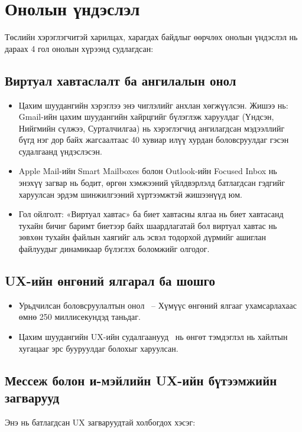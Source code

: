 \section{Онолын үндэслэл}

Төслийн хэрэглэгчитэй харилцах, харагдах байдлыг өөрчлөх онолын үндэслэл нь дараах 4 гол онолын хүрээнд судлагдсан:
\subsection{Виртуал хавтаслалт ба ангилалын онол}
\begin{itemize}
    \item Цахим шуудангийн хэрэглээ энэ чиглэлийг анхлан хөгжүүлсэн. Жишээ нь: Gmail-ийн
    цахим шуудангийн хайрцгийг бүлэглэж харуулдаг (Үндсэн, Нийгмийн сүлжээ, Сурталчилгаа) нь хэрэглэгчид ангилагдсан мэдээллийг бүгд нэг дор байх жагсаалтаас 40 хувиар илүү хурдан боловсруулдаг гэсэн судалгаанд \cite{google2013gmailtabs} үндэслэсэн.

    \item Apple Mail-ийн Smart Mailboxes болон Outlook-ийн Focused Inbox нь энэхүү
    загвар нь бодит, өргөн хэмжээний үйлдвэрлэлд батлагдсан гэдгийг
    харуулсан эрдэм шинжилгээний хүртээмжтэй жишээнүүд юм.

    \item Гол ойлголт:
    «Виртуал хавтас» ба биет хавтасны ялгаа нь биет хавтасанд тухайн бичиг баримт биетээр байх шаардлагатай бол виртуал хавтас нь зөвхөн тухайн файлын хаягийг аль эсвэл тодорхой дүрмийг ашиглан файлуудыг динамикаар бүлэглэх боломжийг олгодог.

\end{itemize}

\subsection{UX-ийн өнгөний ялгарал ба шошго}
\begin{itemize}
    \item Урьдчилсан боловсруулалтын онол~\cite{healey2012preattentive} – Хүмүүс өнгөний ялгааг ухамсарлахаас өмнө 250 миллисекундэд таньдаг.
    \item Цахим шуудангийн UX-ийн судалгаанууд~\cite{bellotti2003taking} нь өнгөт тэмдэглэл нь хайлтын хугацааг эрс
    бууруулдаг болохыг харуулсан.

\end{itemize}
\subsection{Мессеж болон и-мэйлийн UX-ийн бүтээмжийн загварууд}
Энэ нь батлагдсан UX загваруудтай холбогдох хэсэг:

